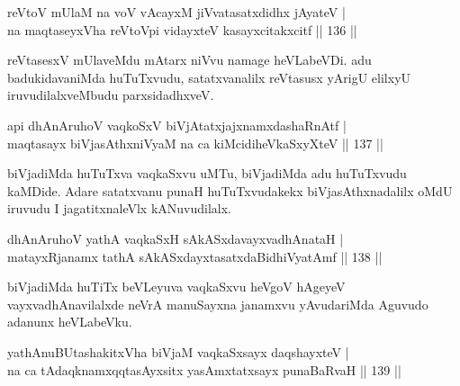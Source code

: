 \begin{shl}
reVtoV mUlaM na voV vAcayxM jiVvatasatxdidhx jAyateV |\\
na maqtaseyxVha reVtoV\s pi vidayxteV kasayxcitakxcitf \hfill || 136 ||
\end{shl}

\begin{artha}
reVtasesxV mUlaveMdu mAtarx niVvu namage heVLabeVDi. adu badukidavaniMda huTuTxvudu, satatxvanalilx reVtasusx yArigU elilxyU iruvudilalxveMbudu parxsidadhxveV.
\end{artha}

\begin{shl}
\footnotemark[1]{}api dhAnAruhoV vaqkoSxV biVjAtatxjajxnamxdashaRnAtf |\\
maqtasayx biVjasAthxniVyaM na ca kiMcidiheVkaSxyXteV \hfill || 137 ||
\end{shl}

\begin{artha}
biVjadiMda huTuTxva vaqkaSxvu uMTu, biVjadiMda adu huTuTxvudu kaMDide. Adare satatxvanu punaH huTuTxvudakekx biVjasAthxnadalilx oMdU iruvudu I jagatitxnaleVlx kANuvudilalx.
\end{artha}%

\begin{shl}
dhAnAruhoV yathA vaqkaSxH sAkASxdavayxvadhAnataH |\\
matayxRjanamx tathA sAkASxdayxtasatxdaBidhiVyatAmf \hfill || 138 ||
\end{shl}

\begin{artha}
biVjadiMda huTiTx beVLeyuva vaqkaSxvu heVgoV hAgeyeV vayxvadhAnavilalxde neVrA manuSayxna janamxvu yAvudariMda Aguvudo adanunx heVLabeVku.
\end{artha}

\begin{shl}
yathA\s nuBUtashakitxVha biVjaM vaqkaSxsayx daqshayxteV |\\
na ca tAdaqknamxqqtasAyxsitx yasAmxtatxsayx punaBaRvaH \hfill || 139 ||
\end{shl}

